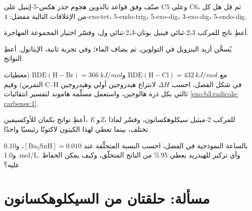 \begin{exercise}[$\star\star$]\label{exo:b3:radicals-carbenes:7}
صنّف وفق قواعد بالدوين هجوم جذر هكس-5-إينيل على C5 وعلى C6،
ثم قل هل كل من الإغلاقات التالية مفضل: 4-exo-tet، 5-endo-trig،
5-exo-dig، 3-exo-dig، 5-endo-dig.
\end{exercise}

\begin{exercise}[$\star\star$]\label{exo:b3:radicals-carbenes:8}
أعطِ ناتج  للمركب 2،3-ثنائي فينيل بوتان-2،3-ثنائي ول،
وفسّر اختيار المجموعة المهاجرة.
\end{exercise}

\begin{exercise}[$\star\star$]\label{exo:b3:radicals-carbenes:9}
يُسخَّن أزيد البنزويل في التولوين، ثم يضاف الماء؛ وفي تجربة ثانية،
الإيثانول. أعطِ النواتج.
\end{exercise}

\begin{exercise}[$\star\star\star$]\label{exo:b3:radicals-carbenes:10}
مع $\mathrm{BDE(H{-}Cl)} = \qty{432}{kJ/mol}$ و$\mathrm{BDE(H{-}Br)} = \qty{366}{kJ/mol}$ (معطيات التمرين) وقيم C--H في
شكل الفصل، احسب $\Delta H$ لانتزاع هيدروجين أولي وهيدروجين ثالثي
بكل ذرة هالوجين، واستعمل مسلّمة هاموند لتفسير
انتقائيات \cref{exo:b3:radicals-carbenes:1}.
\end{exercise}

\begin{exercise}[$\star\star\star$]\label{exo:b3:radicals-carbenes:11}
أعطِ نواتج بكمان للأوكسيمين، \textit{E} و\textit{Z}، للمركب 2-ميثيل سيكلوهكسانون،
وفسّر لماذا تختلف، بينما تعطي  لهذا
الكيتون لاكتونًا رئيسيًا واحدًا.
\end{exercise}

\begin{exercise}[$\star\star\star$]\label{exo:b3:radicals-carbenes:12}
بالساعة النموذجية في الفصل، احسب النسبة المتحلّقة عند $[\mathrm{Bu_3SnH}] = 0.010$،
و0.10 و\qty{1.0}{mol/L}. وأي تركيز للهيدريد يعطي 95\,\% من الناتج المتحلّق، وكيف
يمكن الحفاظ عليه؟
\end{exercise}

\section{مسألة: حلقتان من السيكلوهكسانون}

